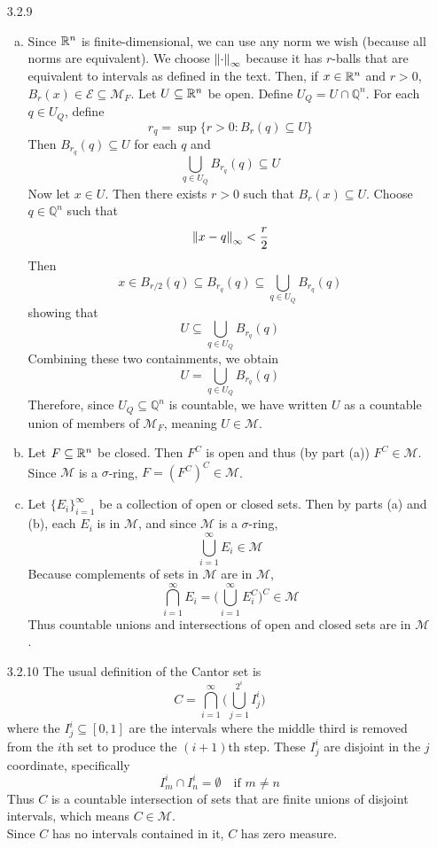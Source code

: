 \documentclass[../../Solutions.tex]{subfiles}
\begin{document}
\begin{itemize}
	\item [3.2.9]
	\begin{enumerate}[(a)]
		\item Since $\mathbb{R}^n$ is finite-dimensional, we can use any norm we wish (because all norms are equivalent).
			We choose $\left\lVert\cdot\right\rVert_\infty$ because it has $r$-balls that are equivalent to intervals as defined in the text.
			Then, if $x \in \mathbb{R}^n$ and $r > 0$, $B_r(x) \in \mathcal{E} \subseteq \mathcal{M}_F$.
			Let $U \subseteq \mathbb{R}^n$ be open.
			Define $U_Q = U\cap\mathbb{Q}^n$.
			For each $q \in U_Q$, define
			$$ r_q = \sup\{r > 0 : B_r(q) \subseteq U \} $$
			Then $B_{r_q}(q) \subseteq U$ for each $q$ and
			$$ \bigcup_{q \in U_Q} B_{r_q}(q) \subseteq U $$
			Now let $x \in U$.
			Then there exists $r > 0$ such that $B_r(x) \subseteq U$.
			Choose $q \in \mathbb{Q}^n$ such that
			$$ \left\lVert x-q\right\rVert_\infty < \frac{r}{2} $$
			Then
			$$ x \in B_{r/2}(q) \subseteq B_{r_q}(q) \subseteq \bigcup_{q \in U_Q} B_{r_q}(q) $$
			showing that
			$$ U \subseteq \bigcup_{q \in U_Q} B_{r_q}(q) $$
			Combining these two containments, we obtain
			$$ U = \bigcup_{q \in U_Q} B_{r_q}(q) $$
			Therefore, since $U_Q \subseteq \mathbb{Q}^n$ is countable, we have written $U$ as a countable union of members of $\mathcal{M}_F$, meaning $U \in \mathcal{M}$.
		\item Let $F \subseteq \mathbb{R}^n$ be closed.
			Then $F^C$ is open and thus (by part (a)) $F^C \in \mathcal{M}$.
			Since $\mathcal{M}$ is a $\sigma$-ring, $F = (F^C)^C \in \mathcal{M}$.
		\item Let $\{E_i\}_{i=1}^\infty$ be a collection of open or closed sets.
			Then by parts (a) and (b), each $E_i$ is in $\mathcal{M}$, and since $\mathcal{M}$ is a $\sigma$-ring,
			$$ \bigcup_{i=1}^\infty E_i \in \mathcal{M} $$
			Because complements of sets in $\mathcal{M}$ are in $\mathcal{M}$,
			$$ \bigcap_{i=1}^\infty E_i = \Big(\bigcup_{i=1}^\infty E_i^C\Big)^C \in \mathcal{M} $$
			Thus countable unions and intersections of open and closed sets are in $\mathcal{M}$.
	\end{enumerate}
	
	\item [3.2.10] The usual definition of the Cantor set is
		$$ C = \bigcap_{i=1}^\infty \Big( \bigcup_{j=1}^{2^i} I^i_j \Big) $$
		where the $I^i_j \subseteq [0,1]$ are the intervals where the middle third is removed from the $i$th set to produce the $(i+1)$th step.
		These $I^i_j$ are disjoint in the $j$ coordinate, specifically
		$$ I^i_m \cap I^i_n = \emptyset \quad\text{if } m \neq n $$
		Thus $C$ is a countable intersection of sets that are finite unions of disjoint intervals, which means $C \in \mathcal{M}$. \\
		Since $C$ has no intervals contained in it, $C$ has zero measure.
	
\end{itemize}
\end{document}
